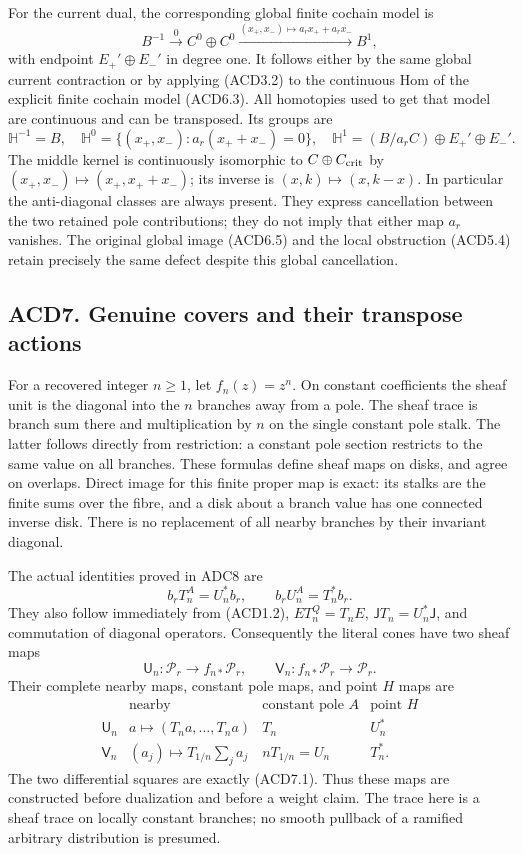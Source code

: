 For the current dual, the corresponding global finite cochain model is
\[
B^{-1}\xrightarrow{0}C^0\oplus C^0
\xrightarrow{(x_+,x_-)\mapsto a_rx_++a_rx_-}B^1,
\tag{ACD6.6}
\] with endpoint \(E_+'\oplus E_-'\) in degree one. It follows either by
the same global current contraction or by applying (ACD3.2) to the
continuous Hom of the explicit finite cochain model (ACD6.3). All
homotopies used to get that model are continuous and can be transposed.
Its groups are \[
\mathbb H^{-1}=B,\quad
\mathbb H^0=\{(x_+,x_-):a_r(x_++x_-)=0\},\quad
\mathbb H^1=(B/a_rC)\oplus E_+'\oplus E_-'.
\tag{ACD6.7}
\] The middle kernel is continuously isomorphic to
\(C\oplus C_{\rm crit}\) by \((x_+,x_-)\mapsto(x_+,x_++x_-)\); its
inverse is \((x,k)\mapsto(x,k-x)\). In particular the anti-diagonal
classes are always present. They express cancellation between the two
retained pole contributions; they do not imply that either map \(a_r\)
vanishes. The original global image (ACD6.5) and the local obstruction
(ACD5.4) retain precisely the same defect despite this global
cancellation.

\subsection{ACD7. Genuine covers and their transpose
actions}\label{acd7.-genuine-covers-and-their-transpose-actions}

For a recovered integer \(n\geq1\), let \(f_n(z)=z^n\). On constant
coefficients the sheaf unit is the diagonal into the \(n\) branches away
from a pole. The sheaf trace is branch sum there and multiplication by
\(n\) on the single constant pole stalk. The latter follows directly
from restriction: a constant pole section restricts to the same value on
all branches. These formulas define sheaf maps on disks, and agree on
overlaps. Direct image for this finite proper map is exact: its stalks
are the finite sums over the fibre, and a disk about a branch value has
one connected inverse disk. There is no replacement of all nearby
branches by their invariant diagonal.

The actual identities proved in ADC8 are \[
b_rT_n^A=U_n^*b_r,\qquad b_rU_n^A=T_n^*b_r.
\tag{ACD7.1}
\] They also follow immediately from (ACD1.2), \(ET_n^Q=T_nE\),
\(\mathsf JT_n=U_n^*\mathsf J\), and commutation of diagonal operators.
Consequently the literal cones have two sheaf maps \[
\mathsf U_n:\mathscr P_r\to f_{n*}\mathscr P_r,
\qquad \mathsf V_n:f_{n*}\mathscr P_r\to\mathscr P_r.
\tag{ACD7.2}
\] Their complete nearby maps, constant pole maps, and point \(H\) maps
are \[
\begin{array}{c|c|c|c}
&\text{nearby}&\text{constant pole }A&\text{point }H\\\hline
\mathsf U_n&a\mapsto(T_na,\ldots,T_na)&T_n&U_n^*\\
\mathsf V_n&(a_j)\mapsto T_{1/n}\sum_j a_j&nT_{1/n}=U_n&T_n^*.
\end{array}
\tag{ACD7.3}
\] The two differential squares are exactly (ACD7.1). Thus these maps
are constructed before dualization and before a weight claim. The trace
here is a sheaf trace on locally constant branches; no smooth pullback
of a ramified arbitrary distribution is presumed.


